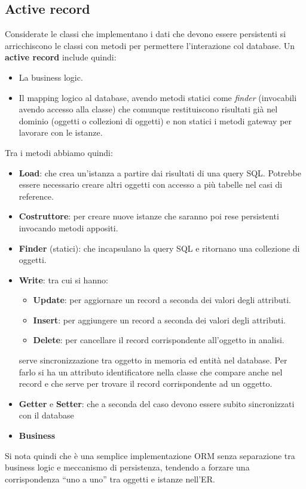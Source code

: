 \subsection{Active record}
Considerate le classi che implementano i dati che devono essere persistenti si arricchiscono le classi con metodi per permettere l'interazione col database. Un \textbf{active record} include quindi:
\begin{itemize}
    \item La business logic.
    \item Il mapping logico al database, avendo  metodi statici come \textit{finder} (invocabili avendo accesso alla classe) che comunque restituiscono risultati già nel dominio (oggetti o collezioni di oggetti) e non statici i metodi gateway per lavorare con le istanze.
\end{itemize}
Tra i metodi abbiamo quindi:
\begin{itemize}
    \item \textbf{Load}: che crea un'istanza a partire dai risultati di una query SQL. Potrebbe essere necessario creare altri oggetti con accesso a più tabelle nel casi di reference.
    \item \textbf{Costruttore}: per creare nuove istanze che saranno poi rese persistenti invocando metodi appositi.
    \item \textbf{Finder} (statici): che incapsulano la query SQL e ritornano una collezione di oggetti.
    \item \textbf{Write}: tra cui si hanno:
    \begin{itemize}
        \item \textbf{Update}: per aggiornare un record a seconda dei valori degli attributi.
        \item \textbf{Insert}: per aggiungere un record a seconda dei valori degli attributi.
        \item \textbf{Delete}: per cancellare il record corrispondente all'oggetto in analisi.
    \end{itemize}
    serve sincronizzazione tra oggetto in memoria ed entità nel database. Per farlo si ha un attributo identificatore nella classe che compare anche nel record e che serve per trovare il record corrispondente ad un oggetto.
    \item \textbf{Getter} e \textbf{Setter}: che a seconda del caso devono essere subito sincronizzati con il database
    \item \textbf{Business}
\end{itemize}
Si nota quindi che è una semplice implementazione ORM senza separazione tra business logic e meccanismo di persistenza, tendendo a forzare una corrispondenza “uno a uno” tra oggetti e istanze nell'ER.
